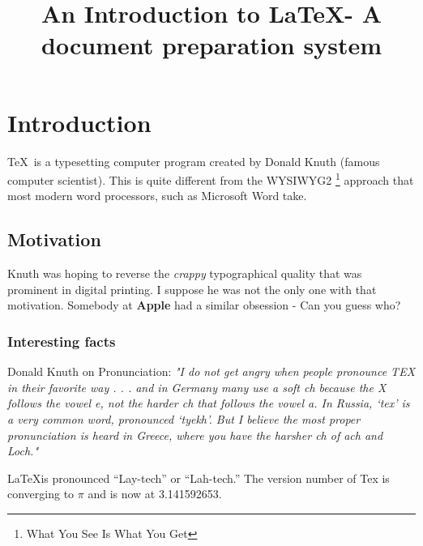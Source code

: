 \documentclass{article}
\title{An Introduction to \LaTeX - A document preparation system}
\author{}
\date{}
\begin{document}
\maketitle

\section{Introduction}
\TeX \ is a typesetting computer program created by Donald Knuth (famous computer scientist). This is quite different from the WYSIWYG2 \footnote{What You See Is What You Get} approach that most modern word processors, such as Microsoft Word take.

\subsection{Motivation}
Knuth was hoping to reverse the \emph{crappy} typographical quality that was prominent in digital printing.
I suppose he was not the only one with that motivation. 
Somebody at {\bf{Apple}} had a similar obsession - Can you guess who?

\subsubsection{Interesting facts}
Donald Knuth on Pronunciation:
\newline
{\it{"I do not get angry when people pronounce TEX in their
favorite way . . . and in Germany many use a soft ch because the X follows the vowel e, not
the harder ch that follows the vowel a. In Russia, ‘tex’ is a very common word, pronounced
‘tyekh’. But I believe the most proper pronunciation is heard in Greece, where you have the
harsher ch of ach and Loch."}}
\par
\LaTeX is pronounced “Lay-tech” or “Lah-tech.”
\noindent
The version number of Tex is converging to $\pi$ and is now at 3.141592653.
\end{document}
